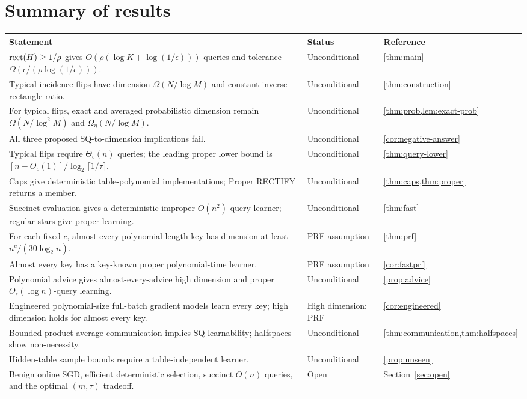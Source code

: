 \clearpage
\section*{Summary of results}
\begin{center}\small
\renewcommand{\arraystretch}{1.5}
\begin{tabularx}{\linewidth}{@{}X >{\raggedright\arraybackslash}p{.20\linewidth}>{\raggedright\arraybackslash}p{.14\linewidth}@{}}\toprule
Statement & Status & Reference\\\midrule
$\operatorname{rect}(H)\ge1/\rho$ gives $O(\rho(\log K+\log(1/\epsilon)))$ queries and tolerance $\Omega(\epsilon/(\rho\log(1/\epsilon)))$. & Unconditional & \cref{thm:main}\\
Typical incidence flips have dimension $\Omega(N/\log M)$ and constant inverse rectangle ratio. & Unconditional & \cref{thm:construction}\\
For typical flips, exact and averaged probabilistic dimension remain $\Omega(N/\log^2M)$ and $\Omega_\eta(N/\log M)$. & Unconditional & \cref{thm:prob,lem:exact-prob}\\
All three proposed SQ-to-dimension implications fail. & Unconditional & \cref{cor:negative-answer}\\
Typical flips require $\Theta_\epsilon(n)$ queries; the leading proper lower bound is $[n-O_\epsilon(1)]/\log_2\lceil1/\tau\rceil$. & Unconditional & \cref{thm:query-lower}\\
Caps give deterministic table-polynomial implementations; Proper RECTIFY returns a member. & Unconditional & \cref{thm:caps,thm:proper}\\
Succinct evaluation gives a deterministic improper $O(n^2)$-query learner; regular stars give proper learning. & Unconditional & \cref{thm:fast}\\
For each fixed $c$, almost every polynomial-length key has dimension at least $n^c/(30\log_2 n)$. & PRF assumption & \cref{thm:prf}\\
Almost every key has a key-known proper polynomial-time learner. & PRF assumption & \cref{cor:fastprf}\\
Polynomial advice gives almost-every-advice high dimension and proper $O_\epsilon(\log n)$-query learning. & Unconditional & \cref{prop:advice}\\
Engineered polynomial-size full-batch gradient models learn every key; high dimension holds for almost every key. & High dimension: PRF & \cref{cor:engineered}\\
Bounded product-average communication implies SQ learnability; halfspaces show non-necessity. & Unconditional & \cref{thm:communication,thm:halfspaces}\\
Hidden-table sample bounds require a table-independent learner. & Unconditional & \cref{prop:unseen}\\
Benign online SGD, efficient deterministic selection, succinct $O(n)$ queries, and the optimal $(m,\tau)$ tradeoff. & Open & Section~\ref{sec:open}\\\bottomrule
\end{tabularx}
\end{center}
